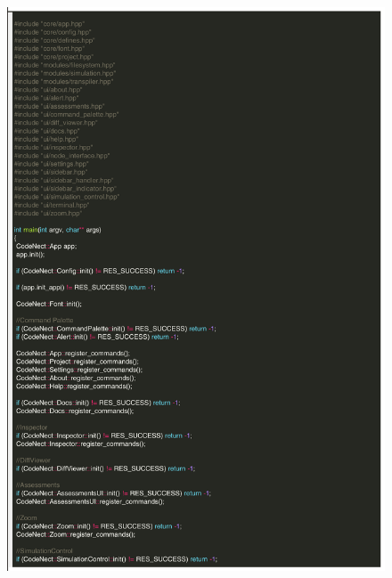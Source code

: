 \clearpage
{}

\begin{figure}[H]
	 \centering
	 \includegraphics[width=\textwidth]{figures/code/main-1.png}
\end{figure}
